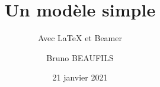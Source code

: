 \title[SIF]{Un modèle simple}
\subtitle{Avec \LaTeX{} et Beamer}
\author{Bruno BEAUFILS}
\date{21 janvier 2021}
